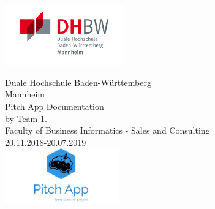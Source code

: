 \thispagestyle{plain}

\begin{titlepage}
	
		
		{\includegraphics[height=2.6cm]{fig/DHBW_MA_Logo.jpg}}	
	
	\enlargethispage{20mm}
	
	\begin{center}
		\vspace*{12mm}   Duale Hochschule Baden-Württemberg\\
		\vspace*{3mm}   Mannheim\\
		\vspace*{12mm}	{\LARGE Pitch App Documentation }\\
		\vspace*{12mm}	{\large by Team 1.}\\
		\vspace*{12mm}	 {\large Faculty of Business Informatics - Sales and Consulting}\\
		\vspace*{12mm}	20.11.2018-20.07.2019\\
		\vspace*{12mm}
		{\includegraphics[height=2.4cm]{fig/logo.png}}
		

\end{center}
\end{titlepage}
